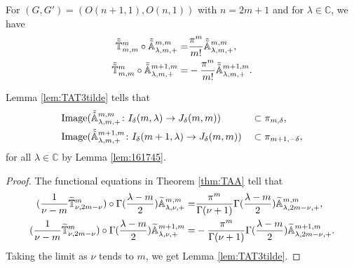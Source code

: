 \begin{lemma}
\label{lem:TAT3tilde}
For $(G,G')=(O(n+1,1),O(n,1))$ with $n=2m+1$
 and for $\lambda \in {\mathbb{C}}$, 
 we have
\begin{align}
\label{eqn:TAA3tilde}
   \tilde{\tilde{{\mathbb{T}}}}_{{m},{m}}^{{m}} \circ \tilde{\tilde{{\mathbb{A}}}}_{{\lambda},{m},{+}}^{{m, m}}
   =&
   \frac{\pi^m}{m!} \tilde{\tilde{{\mathbb{A}}}}_{{\lambda},{m},{+}}^{{m, m}}, 
\\
\label{eqn:180293}
   \tilde{\tilde{{\mathbb{T}}}}_{{m},{m}}^{{m}} \circ \tilde{\tilde{{\mathbb{A}}}}_{{\lambda},{m},{+}}^{{m+1, m}}
   =&
   -\frac{\pi^m}{m!} \tilde{\tilde{{\mathbb{A}}}}_{{\lambda},{m},{+}}^{{m+1, m}}.  
\end{align}
\end{lemma}

Lemma \ref{lem:TAT3tilde} tells that 
\begin{alignat*}{3}
&{\operatorname{Image}}
(\tilde{\tilde{{\mathbb{A}}}}_{{\lambda},{m},{+}}^{{m, m}}\colon I_{\delta}(m,\lambda) \to J_{\delta}(m,m)) 
&&\subset \pi_{m,\delta}, 
\\
&{\operatorname{Image}}
(\tilde{\tilde{{\mathbb{A}}}}_{{\lambda},{m},{+}}^{{m+1, m}}\colon I_{\delta}(m+1,\lambda) 
\to J_{\delta}(m,m)) 
&&\subset \pi_{m+1,-\delta}, 
\end{alignat*}
for all $\lambda \in {\mathbb{C}}$
by Lemma \ref{lem:161745}.  


\begin{proof}
The functional equations in Theorem \ref{thm:TAA} tell
 that 
\begin{align*}
(\frac{1}{\nu-m} \widetilde{{\mathbb{T}}}_{{\nu},{2m-\nu}}^{{m}}) 
\circ 
\Gamma(\frac{\lambda-m}{2}) {\widetilde{\mathbb{A}}}_{{\lambda},{\nu},{+}}^{{m,m}} 
=& 
\frac{\pi^m}{\Gamma(\nu+1)} \Gamma(\frac{\lambda-m}{2}) 
{\widetilde{\mathbb{A}}}_{{\lambda},{2m-\nu},{+}}^{{m,m}}, 
\\
(\frac{1}{\nu-m} \widetilde{{\mathbb{T}}}_{{\nu},{2m-\nu}}^{{m}}) 
\circ 
\Gamma(\frac{\lambda-m}{2}) {\widetilde{\mathbb{A}}}_{{\lambda},{\nu},{+}}^{{m+1,m}} 
=& 
-\frac{\pi^m}{\Gamma(\nu+1)} \Gamma(\frac{\lambda-m}{2}) 
{\widetilde{\mathbb{A}}}_{{\lambda},{2m-\nu},{+}}^{{m+1,m}}.  
\end{align*}
Taking the limit as $\nu$ tends to $m$, 
 we get Lemma \ref{lem:TAT3tilde}.  
\end{proof}

